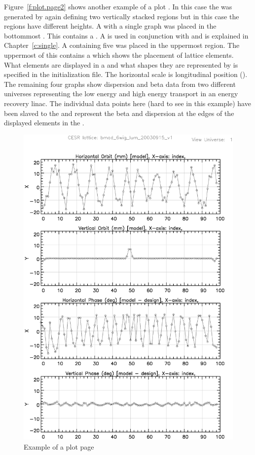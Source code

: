 Figure~\ref{f:plot.page2} shows another example of a plot .
In this case the  was generated by again defining two
vertically stacked regions but in this case the regions have different
heights.  A  with a single graph was placed in the
bottommost .  This  contains a .
A  is used in conjunction with  and is
explained in Chapter~\ref{c:single}. A  containing
five  was placed in the uppermost region. The uppermost
 of this  contains a  which
shows the placement of lattice elements.  What elements are displayed
in a  and what shapes they are represented by is
specified in the initialization file. The horizontal scale is
longitudinal position ().  The remaining four graphs show
dispersion and beta data from two different universes representing the
low energy and high energy transport in an energy recovery linac. The
individual data points here (hard to see in this example) have been
slaved to the  and represent the beta and dispersion at
the edges of the displayed elements in the .


\begin{figure}
  \centering
  \includegraphics[width=5in]{plot-page1.eps}
  \caption{Example of a plot page}
  \label{f:plot.page1}
\end{figure}

